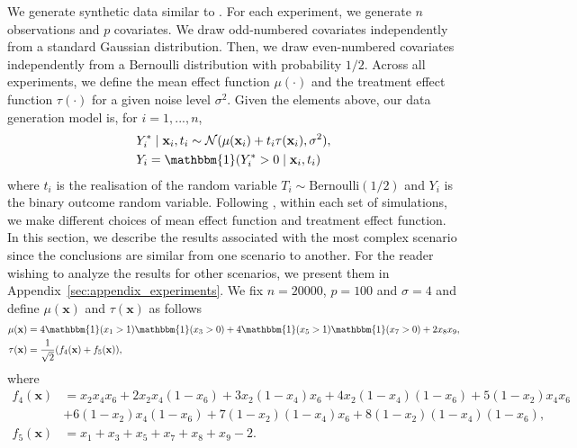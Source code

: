 \documentclass{article}
\def\x{\mathbf x}
\begin{document}
We generate synthetic data similar  to  \cite{powers2018some}. For each experiment, we generate $n$ observations and $p$ covariates. We draw odd-numbered covariates independently from a standard Gaussian distribution. Then, we draw even-numbered covariates independently from a Bernoulli distribution with probability $1/2$. Across all experiments, we define the mean effect function $\mu(\cdot)$ and the treatment effect function $\tau(\cdot)$ for a given noise level $\sigma^2$. Given the elements above, our data generation model is, for $i=1,...,n$,
\begin{align*}
    &Y_i^* \mid \x_i, t_i \sim \mathcal{N}(\mu(\x_i) + t_i\tau(\x_i), \sigma^2),\\
    &Y_i = \mathbbm{1}(Y_i^* > 0 \mid \x_i, t_i)
\end{align*}
where $t_i$ is the realisation of the random variable $T_i \sim \mathrm{Bernoulli}(1/2)$ and $Y_i$ is the binary outcome random variable. Following \cite{powers2018some},  within each set of simulations, we make different choices of mean effect function and treatment effect function. In this section, we describe the results associated with the most complex scenario since the conclusions are similar from one scenario to another. For the reader wishing to analyze the results for other scenarios, we present them in Appendix~\ref{sec:appendix_experiments}. We fix $n=20000$, $p=100$ and $\sigma=4$ and define $\mu(\x)$ and $\tau(\x)$ as follows
\begin{align*}
    \mu(\x) &= 4 \mathbbm{1}(x_1 > 1)\mathbbm{1}(x_3 > 0) + 4\mathbbm{1}(x_5 > 1)\mathbbm{1}(x_7 > 0) + 2x_8x_9,\\
   \tau(\x) &= \frac{1}{\sqrt{2}} (f_4(\x) + f_5(\x)),\\
\end{align*}
where
\begin{align*}
    f_4(\x) &= x_2 x_4 x_6 + 2 x_2 x_4 (1-x_6) +3x_2(1-x_4)x_6 + 4x_2(1-x_4)(1-x_6) + 5(1-x_2)x_4x_6 \\
            &+ 6(1-x_2)x_4(1-x_6) + 7 (1-x_2)(1-x_4)x_6 + 8(1-x_2)(1-x_4)(1-x_6),\\
    f_5(\x) &= x_1 + x_3 + x_5 + x_7 + x_8 + x_9 - 2.\\
\end{align*}
\end{document}
